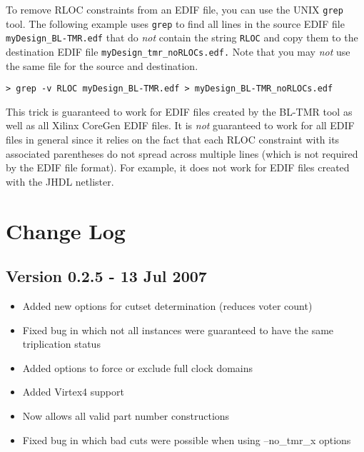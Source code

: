 \documentclass[english]{article}
\begin{document}
To remove RLOC constraints from an EDIF file, you can use the UNIX 
\texttt{grep} tool. The following example uses \texttt{grep} to find all lines 
in the source EDIF file \texttt{myDesign\_BL-TMR.edf} that do \emph{not} contain 
the string \texttt{RLOC} and copy them to the destination EDIF file 
\texttt{myDesign\_tmr\_noRLOCs.edf.} Note that you may \emph{not} use the same 
file for the source and destination.

\begin{verbatim}
> grep -v RLOC myDesign_BL-TMR.edf > myDesign_BL-TMR_noRLOCs.edf
\end{verbatim}

This trick is guaranteed to work for EDIF files created by the BL-TMR tool as 
well as all Xilinx CoreGen EDIF files. It is \emph{not} guaranteed to work for 
all EDIF files in general since it relies on the fact that each RLOC constraint 
with its associated parentheses do not spread across multiple lines (which is 
not required by the EDIF file format). For example, it does not work for EDIF 
files created with the JHDL netlister.

\section{Change Log}

\subsection*{Version 0.2.5 - 13 Jul 2007}
\begin{itemize}
\item Added new options for cutset determination (reduces voter count)
\item Fixed bug in which not all instances were guaranteed to have the same triplication status
\item Added options to force or exclude full clock domains
\item Added Virtex4 support
\item Now allows all valid part number constructions
\item Fixed bug in which bad cuts were possible when using --no\_tmr\_x options
\end{itemize}
\end{document}
